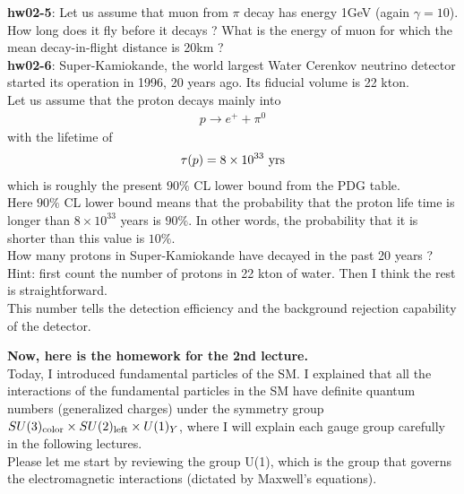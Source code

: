 \documentclass[12pt]{article}
\begin{document}
\begin{enumerate}
{\bf hw02-5}:
Let us assume that muon from $\pi$ decay has energy
1GeV (again $\gamma = 10$).  How long does it fly
before it decays ?   What is the energy of muon
for which the mean decay-in-flight distance is 20km ?\\

{\bf hw02-6}:
Super-Kamiokande, the world largest Water Cerenkov
neutrino detector started its operation in 1996,
20 years ago. Its fiducial volume is 22 kton.\\

Let us assume that the proton decays mainly into
\begin{eqnarray} 
p \to e^+ + \pi^0
\end{eqnarray} 
with the lifetime of
\begin{eqnarray} 
\tau(p) = 8 \times 10^{33} ~\rm yrs
\end{eqnarray} 
which is roughly the present $90\%$ CL lower bound from
the PDG table.\\

Here $90\%$ CL lower bound means that the probability
that the proton life time is longer than
$8 \times 10^{33}$ years is $90\%$.  In other words,
the probability that it is shorter than this value
is $10\%$. \\

How many protons in Super-Kamiokande have decayed
in the past 20 years ? \\

Hint: first count the number of protons in 22 kton
of water.  Then I think the rest is straightforward.\\

This number tells the detection efficiency and the
background rejection capability of the detector.
\end{enumerate}

{\bf Now, here is the homework for the 2nd lecture.}\\

Today, I introduced fundamental particles of the SM.
I explained that all the interactions of the fundamental
particles in the SM have definite quantum numbers (generalized
charges) under the symmetry group
$SU(3)_{\rm color} \times SU(2)_{\rm left} \times U(1)_Y$,
where I will explain each gauge group carefully in the
following lectures.\\

Please let me start by reviewing the group U(1),
which is the group that governs the electromagnetic
interactions (dictated by Maxwell's equations).\\
\end{document}
